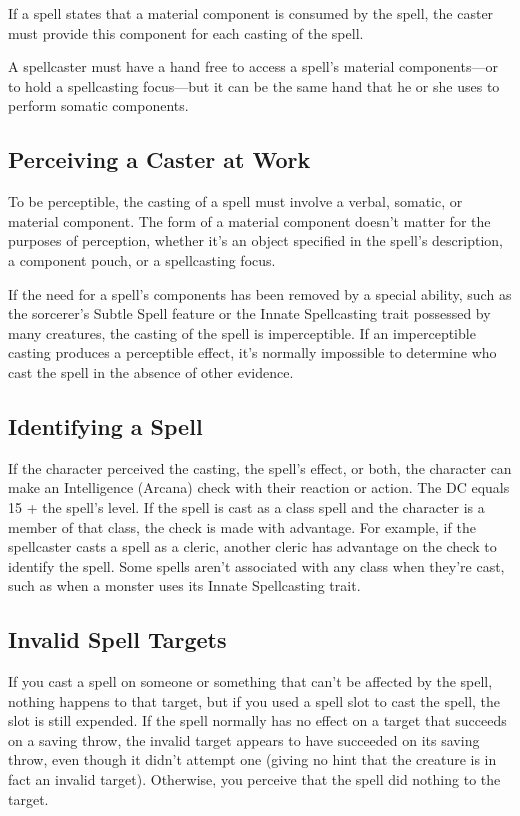 \documentclass[a4paper,10pt,twoside,twocolumn,openany,bg=none,nodeprecatedcode]{dndarticle}
\begin{document}
If a spell states that a material component is consumed by the spell, the caster must provide this component for each casting of the spell.

A spellcaster must have a hand free to access a spell's material components—or to hold a spellcasting focus—but it can be the same hand that he or she uses to perform somatic components.

\subsection{Perceiving a Caster at Work}
To be perceptible, the casting of a spell must involve a verbal, somatic, or material component. The form of a material component doesn't matter for the purposes of perception, whether it's an object specified in the spell's description, a component pouch, or a spellcasting focus.

If the need for a spell's components has been removed by a special ability, such as the sorcerer's Subtle Spell feature or the Innate Spellcasting trait possessed by many creatures, the casting of the spell is imperceptible. If an imperceptible casting produces a perceptible effect, it's normally impossible to determine who cast the spell in the absence of other evidence.

\subsection{Identifying a Spell}
If the character perceived the casting, the spell's effect, or both, the character can make an Intelligence (Arcana) check with their reaction or action. The DC equals 15 + the spell's level. If the spell is cast as a class spell and the character is a member of that class, the check is made with advantage. For example, if the spellcaster casts a spell as a cleric, another cleric has advantage on the check to identify the spell. Some spells aren't associated with any class when they're cast, such as when a monster uses its Innate Spellcasting trait.

\subsection{Invalid Spell Targets}

If you cast a spell on someone or something that can't be affected by the spell, nothing happens to that target, but if you used a spell slot to cast the spell, the slot is still expended. If the spell normally has no effect on a target that succeeds on a saving throw, the invalid target appears to have succeeded on its saving throw, even though it didn't attempt one (giving no hint that the creature is in fact an invalid target). Otherwise, you perceive that the spell did nothing to the target.
\end{document}
